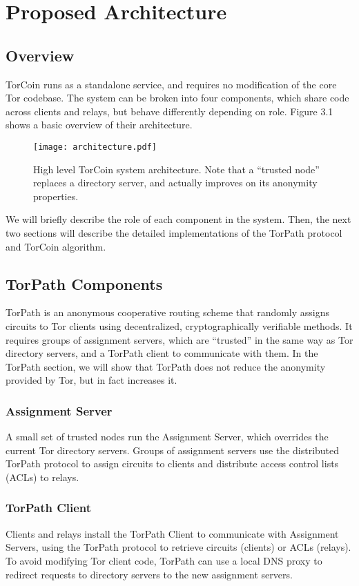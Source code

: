 \section{Proposed Architecture} \label{arch}

\subsection{Overview}

TorCoin runs as a standalone service, and requires no modification of the core
Tor codebase. The system can be broken into four components, which share code
across clients and relays, but behave differently depending on role. Figure 3.1
shows a basic overview of their architecture.

\begin{figure}
  \centering
    \texttt{[image: architecture.pdf]}
  \caption{High level TorCoin system architecture. Note that a ``trusted node''
           replaces a directory server, and actually improves on its
           anonymity properties.}
\end{figure}

We will briefly describe the role of each component in the system. Then, the
next two sections will describe the detailed implementations of the TorPath
protocol and TorCoin algorithm.

\subsection{TorPath Components} TorPath is an anonymous cooperative routing
scheme that randomly assigns circuits to Tor clients using decentralized,
cryptographically verifiable methods. It requires groups of assignment servers,
which are ``trusted'' in the same way as Tor directory servers, and a TorPath
client to communicate with them. In the TorPath section, we will show that
TorPath does not reduce the anonymity  provided by Tor, but in fact increases it.

\subsubsection{Assignment Server} A small set of trusted nodes run the
Assignment Server, which overrides the current Tor directory servers. Groups of
assignment servers use the distributed TorPath protocol to assign circuits to
clients and distribute access control lists (ACLs) to relays.

\subsubsection{TorPath Client} Clients and relays install the TorPath Client to
communicate with Assignment Servers, using the TorPath protocol to retrieve
circuits (clients) or ACLs (relays). To avoid modifying Tor client code, TorPath
can use a local DNS proxy to redirect requests to directory servers to the new
assignment servers.

